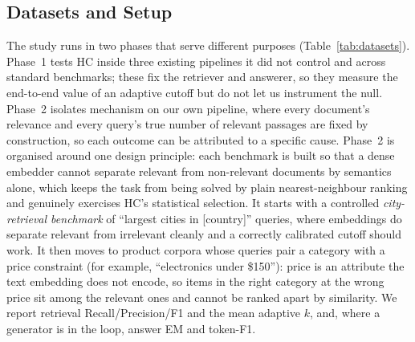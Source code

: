 \documentclass[letterpaper]{article}
\begin{document}
\subsection{Datasets and Setup}
The study runs in two phases that serve different purposes
(Table~\ref{tab:datasets}). Phase~1 tests HC inside three existing
pipelines it did not control and across standard benchmarks; these fix
the retriever and answerer, so they measure the end-to-end value of an
adaptive cutoff but do not let us instrument the null. Phase~2 isolates
mechanism on our own pipeline, where every document's relevance and every
query's true number of relevant passages are fixed by construction, so
each outcome can be attributed to a specific cause. Phase~2 is organised
around one design principle: each benchmark is built so that a dense
embedder cannot separate relevant from non-relevant documents by
semantics alone, which keeps the task from being solved by plain
nearest-neighbour ranking and genuinely exercises HC's statistical
selection. It starts with a controlled \emph{city-retrieval benchmark} of
``largest cities in [country]'' queries, where embeddings do separate
relevant from irrelevant cleanly and a correctly calibrated cutoff should
work. It then moves to product corpora whose queries pair a category with
a price constraint (for example, ``electronics under \$150''): price is
an attribute the text embedding does not encode, so items in the right
category at the wrong price sit among the relevant ones and cannot be
ranked apart by similarity. We report retrieval Recall/Precision/F1 and
the mean adaptive $k$, and, where a generator is in the loop, answer EM
and token-F1.
\end{document}
